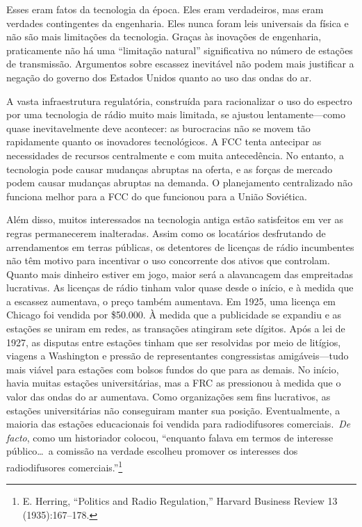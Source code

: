 \documentclass{book}
\newcommand{\ingles}[1]{\textit{#1}}
\begin{document}
Esses eram fatos da tecnologia da época. Eles eram verdadeiros, mas eram verdades
contingentes da engenharia. Eles nunca foram leis universais da física e não são
mais limitações da tecnologia. Graças às inovações de engenharia, praticamente
não há uma ``limitação natural'' significativa no número de estações de transmissão.
Argumentos sobre escassez inevitável não podem mais justificar a negação do governo
dos Estados Unidos quanto ao uso das ondas do ar.

A vasta infraestrutura regulatória, construída para racionalizar o uso do espectro
por uma tecnologia de rádio muito mais limitada, se ajustou lentamente---como
quase inevitavelmente deve acontecer: as burocracias não se movem tão rapidamente
quanto os inovadores tecnológicos. A FCC tenta antecipar as necessidades de recursos
centralmente e com muita antecedência. No entanto, a tecnologia pode causar mudanças
abruptas na oferta, e as forças de mercado podem causar mudanças abruptas na demanda.
O planejamento centralizado não funciona melhor para a FCC do que funcionou para
a União Soviética.

Além disso, muitos interessados na tecnologia antiga estão satisfeitos em ver as
regras permanecerem inalteradas. Assim como os locatários desfrutando de
arrendamentos em terras públicas, os detentores de licenças de rádio incumbentes
não têm motivo para incentivar o uso concorrente dos ativos que controlam. Quanto
mais dinheiro estiver em jogo, maior será a alavancagem das empreitadas lucrativas.
As licenças de rádio tinham valor quase desde o início, e à medida que a escassez
aumentava, o preço também aumentava. Em 1925, uma licença em Chicago foi vendida
por \$50.000. À medida que a publicidade se expandiu e as estações se uniram em
redes, as transações atingiram sete dígitos. Após a lei de 1927, as disputas entre
estações tinham que ser resolvidas por meio de litígios, viagens a Washington e
pressão de representantes congressistas amigáveis---tudo mais viável para estações
com bolsos fundos do que para as demais. No início, havia muitas estações
universitárias, mas a FRC as pressionou à medida que o valor das ondas do ar
aumentava. Como organizações sem fins lucrativos, as estações universitárias não
conseguiram manter sua posição. Eventualmente, a maioria das estações educacionais
foi vendida para radiodifusores comerciais.~\ingles{De facto}, como um historiador
colocou, ``enquanto falava em termos de interesse público\ldots~a comissão na
verdade escolheu promover os interesses dos radiodifusores comerciais.''\footnote{E.
Herring, ``Politics and Radio Regulation,'' Harvard Business Review 13 (1935):167--178.}
\end{document}
